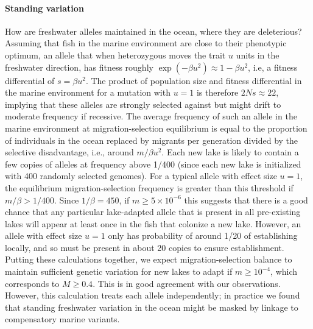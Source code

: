 \documentclass{article}
\begin{document}
\paragraph{Standing variation}
How are freshwater alleles maintained in the ocean, where they are deleterious?
Assuming that fish in the marine environment are close to their phenotypic optimum,
an allele that when heterozygous moves the trait $u$ units in the freshwater direction,
has fitness roughly $\exp(-\beta u^2) \approx 1 - \beta u^2$,
i.e, a fitness differential of $s = \beta u^2$. 
The product of population size and fitness differential in the marine environment for a mutation with $u=1$ is therefore $2Ns \approx 22$, 
implying that these alleles are strongly selected against but might drift to moderate frequency if recessive. 
The average frequency of such an allele in the marine environment at migration-selection equilibrium 
is equal to the proportion of individuals in the ocean replaced by migrants per generation divided by the selective disadvantage, 
i.e., around $m / \beta u^2$. 
Each new lake is likely to contain a few copies of alleles at frequency above 1/400 (since each new lake is initialized with 400 randomly selected genomes). 
For a typical allele with effect size $u=1$, 
the equilibrium migration-selection frequency is greater than this threshold if $m/\beta > 1/400$.
Since $1/\beta = 450$, if $m \ge 5 \times 10^{-6}$ this suggests that there is a good chance that 
any particular lake-adapted allele that is present in all pre-existing lakes 
will appear at least once in the fish that colonize a new lake. 
However, an allele with effect size $u=1$ only has probability of around 1/20 of establishing locally, 
and so must be present in about 20 copies to ensure establishment.
Putting these calculations together, 
we expect migration-selection balance to maintain sufficient genetic variation for new lakes to adapt if $m \ge 10^{-4}$, which corresponds to $M \ge 0.4$.
This is in good agreement with our observations.
However, this calculation treats each allele independently;
in practice we found that standing freshwater variation in the ocean
might be masked by linkage to compensatory marine variants. 
\end{document}
